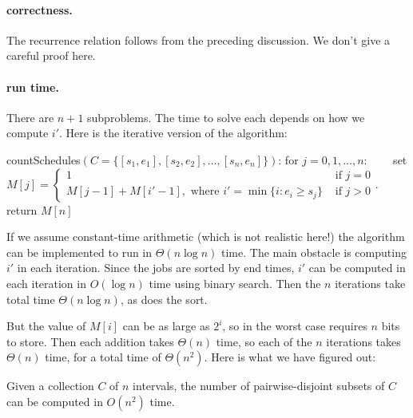 \paragraph{correctness.}
The recurrence relation follows from the preceding discussion.
We don't give a careful proof here.

\paragraph{run time.}
There are $n+1$ subproblems.  The time to solve each depends on how we compute $i'$.
Here is the iterative version of the algorithm:

\begin{myframed}
  \begin{steps}
  \item[]
    \textsf{countSchedules}$(C=\{[s_1, e_1], [s_2, e_2], \ldots, [s_n, e_n]\})$:
    \step for $j=0,1,\ldots, n$:
    \step~~~~set \(M[j]  = \begin{cases}
      1 & \text{ if } j=0 \\
      M[j-1] + M[i'-1], \text{ where }  i' = \min\{ i : e_i \ge s_j \}
      & \text{ if } j>0
    \end{cases}
    \).
    \step return $M[n]$
  \end{steps}
\end{myframed}

If we assume constant-time arithmetic (which is not realistic here!)
the algorithm can be implemented to run in $\Theta(n\log n)$ time.
The main obstacle is computing $i'$ in each iteration.
Since the jobs are sorted by end times,
$i'$ can be computed in each iteration in $O(\log n)$ time using binary search.
Then the $n$ iterations take total time $\Theta(n\log n)$, as does the sort.

But the value of $M[i]$ can be as large as $2^i$,
so in the worst case requires $n$ bits to store.
Then each addition takes $\Theta(n)$ time,
so each of the $n$ iterations takes $\Theta(n)$ time,
for a total time of $\Theta(n^2)$.
Here is what we have figured out:
\begin{theorem}
  Given a collection $C$ of $n$ intervals,
  the number of pairwise-disjoint subsets of $C$
  can be computed in $O(n^2)$ time.
\end{theorem}

